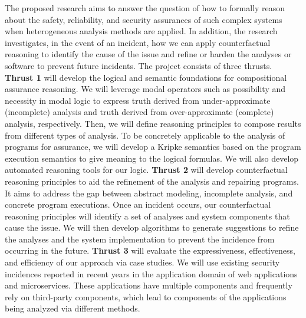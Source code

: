 \documentclass[11pt]{article}
\begin{document}
The proposed research aims to answer the question of how to formally reason about the safety, reliability, and security assurances of such complex systems when heterogeneous analysis methods are applied.
%
In addition, the research investigates, in the event of an incident, how we can apply counterfactual reasoning to identify the cause of the issue and refine or harden the analyses or software to prevent future incidents.
%
The project consists of three thrusts. 
%
{\bf Thrust 1} will develop the logical and semantic foundations for
compositional assurance reasoning.
%
We will leverage modal operators such as possibility and necessity in modal logic to express truth derived from under-approximate (incomplete) analysis and truth derived from over-approximate (complete) analysis, respectively.
%
Then, we will define reasoning principles to compose results from different types of analysis. 
%
To be concretely applicable to the analysis of programs for
assurance, we will develop a Kripke semantics based on the program execution semantics to give meaning to the logical formulas.
%
We will also develop automated reasoning tools for our logic. 
%
{\bf Thrust 2} will develop counterfactual reasoning principles to aid the refinement of the analysis and repairing programs.
%
It aims to address the gap between abstract modeling, incomplete analysis, and concrete program executions.
%
Once an incident occurs, our counterfactual reasoning principles will identify a set of analyses and system components that cause the issue.
%
We will then develop algorithms to generate suggestions to refine the analyses and the system implementation to prevent the incidence from occurring in the future. 
%
{\bf Thrust 3} will evaluate
the expressiveness, effectiveness, and efficiency of our approach via
case studies. We will use existing security incidences
reported in recent years in the application domain of web applications
and microservices. These applications have multiple components and
frequently rely on third-party components, which lead to components of
the applications being analyzed via different methods. 

\end{document}
